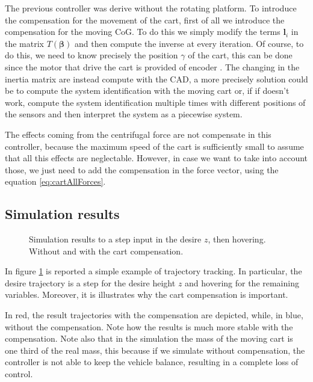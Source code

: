 \noindent The previous controller was derive without the rotating platform. To introduce the compensation for the movement of the cart, first of all we introduce the compensation for the moving CoG. To do this we simply modify the terms $\mathbf{l}_i$ in the matrix $T(\boldsymbol{\beta})$ and then compute the inverse at every iteration. Of course, to do this, we need to know precisely the position $\gamma$ of the cart, this can be done since the motor that drive the cart is provided of encoder \cite{Carlos}. The changing in the inertia matrix are instead compute with the CAD, a more precisely solution could be to compute the system identification with the moving cart or, if if doesn't work, compute the system identification multiple times with different positions of the sensors and then interpret the system as a piecewise system. 

\noindent The effects coming from the centrifugal force are not compensate in this controller, because the maximum speed of the cart is sufficiently small to assume that all this effects are neglectable. However, in case we want to take into account those, we just need to add the compensation in the force vector, using the equation \eqref{eq:cartAllForces}.

\subsection{Simulation results}

\begin{figure}[h!]
	\centering
 	
 	\caption{Simulation results to a step input in the desire $z$, then hovering. Without and with the cart compensation.}
 	\label{fig:simulation1}		
\end{figure}

\noindent In figure \ref{fig:simulation1} is reported a simple example of trajectory tracking. In particular, the desire trajectory is a step for the desire height $z$ and hovering for the remaining variables. Moreover, it is illustrates why the cart compensation is important. 

\noindent In red, the result trajectories with the compensation are depicted, while, in blue, without the compensation. Note how the results is much more stable with the compensation. Note also that in the simulation the mass of the moving cart is one third of the real mass, this because if we simulate without compensation, the controller is not able to keep the vehicle balance, resulting in a complete loss of control. 

